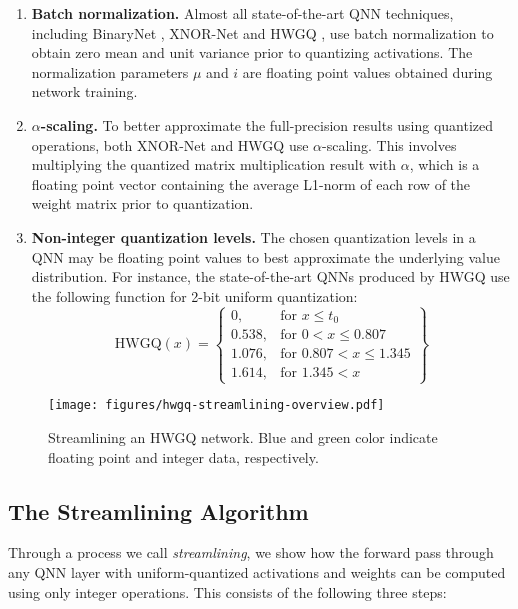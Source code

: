 \documentclass[sigconf]{acmart}
\begin{document}
\begin{enumerate}
	\item \textbf{Batch normalization.} 
	Almost all state-of-the-art QNN techniques, including BinaryNet \cite{binarynet}, XNOR-Net \cite{xnornet} and HWGQ \cite{hwgq}, use batch normalization to obtain zero mean and unit variance prior to quantizing activations.
	The normalization parameters $\mu$ and $i$ are floating point values obtained during network training.
	
	\item \textbf{$\alpha$-scaling.} 
	To better approximate the full-precision results using quantized operations, both XNOR-Net \cite{xnornet} and HWGQ \cite{hwgq} use $\alpha$-scaling.
	This involves multiplying the quantized matrix multiplication result with $\alpha$, which is a floating point vector containing the average L1-norm of each row of the weight matrix prior to quantization.
	
	\item \textbf{Non-integer quantization levels.}
	The chosen quantization levels in a QNN may be floating point values to best approximate the underlying value distribution.
	For instance, the state-of-the-art QNNs produced by HWGQ \cite{hwgq} use the following function for 2-bit uniform quantization:
	\[
	\mathrm{HWGQ}(x) = \left\{\begin{array}{lr}
	0, & \text{for } x \leq t_0\\
	0.538, & \text{for } 0 < x \leq 0.807\\
	1.076, & \text{for } 0.807 < x \leq 1.345\\
	1.614, & \text{for } 1.345 < x
	\end{array}\right\}
	\]
\end{enumerate}

\begin{figure}
\centering
\texttt{[image: figures/hwgq-streamlining-overview.pdf]}
\caption{Streamlining an HWGQ network. Blue and green color indicate floating point and integer data, respectively.}
\label{fig:hwgq-streamlining-overview}
\end{figure}

\subsection{The Streamlining Algorithm}
Through a process we call \emph{streamlining}, we show how the forward pass through any QNN layer with uniform-quantized activations and weights can be computed using only integer operations.
This consists of the following three steps:
\end{document}
